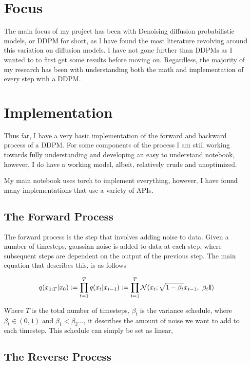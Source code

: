 \documentclass[conference]{IEEEtran}
\begin{document}
\section {Focus}

The main focus of my project has been with Denoising diffusion probabilistic models, or DDPM for short, as I have found the most literature revolving around this variation on diffusion models. I have not gone further than DDPMs as I wanted to to first get some results before moving on. Regardless, the majority of my research has been with understanding both the math and implementation of every step with a DDPM\cite{nain2022-2}\cite{nain2022-3}\cite{ho2020denoising}.

\section {Implementation}

Thus far, I have a very basic implementation of the forward and backward process of a DDPM. For some components of the process I am still working towards fully understanding and developing an easy to understand notebook, however, I do have a working model, albeit, relatively crude and unoptimized.

My main notebook uses torch to implement everything, however, I have found many implementations that use a variety of APIs.

\subsection{The Forward Process}

The forward process is the step that involves adding noise to data. Given a number of timesteps, gaussian noise is added to data at each step, where subsequent steps are dependent on the output of the previous step. The main equation that describes this, is as follows

$$
    q(x_{1:T}\vert x_{0})
    := \prod_{t=1}^{T}q(x_{t}\vert x_{t-1})
    :=\prod_{t=1}^{T}\mathcal{N}(x_{t};\sqrt{1-\beta_{t}} x_{t-1},\ \beta_{t}\bf I)
$$

Where $T$ is the total number of timesteps, $\beta_t$ is the variance schedule, where $\beta_t \in (0,1)$ and $\beta_{1} < \beta_{2}...$, it describes the amount of noise we want to add to each timestep. This schedule can simply be set as linear,

\subsection{The Reverse Process}
\end{document}
